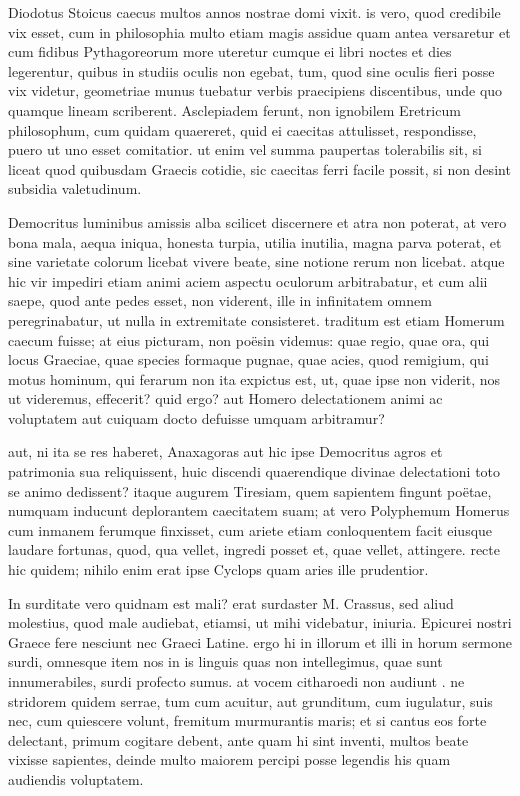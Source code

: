  Diodotus Stoicus caecus multos annos nostrae domi vixit. is vero, quod credibile vix esset, cum in philosophia multo etiam magis assidue quam antea versaretur et cum fidibus Pythagoreorum more uteretur cumque ei libri noctes et dies legerentur, quibus in studiis oculis non egebat, tum, quod sine oculis fieri posse vix videtur, geometriae munus tuebatur verbis praecipiens discentibus, unde quo quamque lineam scriberent. Asclepiadem ferunt, non ignobilem Eretricum philosophum, cum quidam quaereret, quid ei caecitas attulisset, respondisse, puero ut uno esset comitatior. ut enim vel summa paupertas tolerabilis sit, si liceat quod quibusdam Graecis cotidie, sic caecitas ferri facile possit, si non desint subsidia valetudinum.

 Democritus luminibus amissis alba scilicet discernere et atra non poterat, at vero bona mala, aequa iniqua, honesta turpia, utilia inutilia, magna parva poterat, et sine varietate colorum licebat vivere beate, sine notione rerum non licebat. atque hic vir impediri etiam animi aciem aspectu oculorum arbitrabatur, et cum alii saepe, quod ante pedes esset, non viderent, ille in infinitatem omnem peregrinabatur, ut nulla in extremitate consisteret. traditum est etiam Homerum caecum fuisse; at eius picturam, non poësin videmus: quae regio, quae ora, qui locus Graeciae, quae species formaque pugnae, quae acies, quod remigium, qui motus hominum, qui ferarum non ita expictus est, ut, quae ipse non viderit, nos ut videremus, effecerit? quid ergo? aut Homero delectationem animi ac voluptatem aut cuiquam docto defuisse umquam arbitramur?

 aut, ni ita se res haberet, Anaxagoras aut hic ipse Democritus agros et patrimonia sua reliquissent, huic discendi quaerendique divinae delectationi toto se animo dedissent? itaque augurem Tiresiam, quem sapientem fingunt poëtae, numquam inducunt deplorantem caecitatem suam; at vero Polyphemum Homerus cum inmanem ferumque finxisset, cum ariete etiam conloquentem facit eiusque laudare fortunas, quod, qua vellet, ingredi posset et, quae vellet, attingere. recte hic quidem; nihilo enim erat ipse Cyclops quam aries ille prudentior.

 In surditate vero quidnam est mali? erat surdaster M. Crassus, sed aliud molestius, quod male audiebat, etiamsi, ut mihi videbatur, iniuria. Epicurei nostri Graece fere nesciunt nec Graeci Latine. ergo hi in illorum et illi in horum sermone surdi, omnesque item nos in is linguis quas non intellegimus, quae sunt innumerabiles, surdi profecto sumus. at vocem citharoedi non audiunt . ne stridorem quidem serrae, tum cum acuitur, aut grunditum, cum iugulatur, suis nec, cum quiescere volunt, fremitum murmurantis maris; et si cantus eos forte delectant, primum cogitare debent, ante quam hi sint inventi, multos beate vixisse sapientes, deinde multo maiorem percipi posse legendis his quam audiendis voluptatem.

